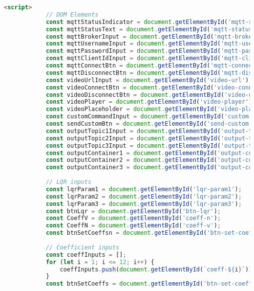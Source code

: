 \begin{lstlisting}[language=html]
        <script>
            // DOM Elements
            const mqttStatusIndicator = document.getElementById('mqtt-status-indicator');
            const mqttStatusText = document.getElementById('mqtt-status-text');
            const mqttBrokerInput = document.getElementById('mqtt-broker');
            const mqttUsernameInput = document.getElementById('mqtt-username');
            const mqttPasswordInput = document.getElementById('mqtt-password');
            const mqttClientIdInput = document.getElementById('mqtt-client-id');
            const mqttConnectBtn = document.getElementById('mqtt-connect');
            const mqttDisconnectBtn = document.getElementById('mqtt-disconnect');
            const videoUrlInput = document.getElementById('video-url');
            const videoConnectBtn = document.getElementById('video-connect');
            const videoDisconnectBtn = document.getElementById('video-disconnect');
            const videoPlayer = document.getElementById('video-player');
            const videoPlaceholder = document.getElementById('video-placeholder');
            const customCommandInput = document.getElementById('custom-command');
            const sendCustomBtn = document.getElementById('send-custom');
            const outputTopic1Input = document.getElementById('output-topic1');
            const outputTopic2Input = document.getElementById('output-topic2');
            const outputTopic3Input = document.getElementById('output-topic3');
            const outputContainer1 = document.getElementById('output-container1');
            const outputContainer2 = document.getElementById('output-container2');
            const outputContainer3 = document.getElementById('output-container3');
            
            // LQR inputs
            const lqrParam1 = document.getElementById('lqr-param1');
            const lqrParam2 = document.getElementById('lqr-param2');
            const lqrParam3 = document.getElementById('lqr-param3');
            const btnLqr = document.getElementById('btn-lqr');
            const CoeffV = document.getElementById('coeff-n');
            const CoeffN = document.getElementById('coeff-v');
            const btnSetCoeffsn = document.getElementById('btn-set-coeffs-n');
            
            // Coefficient inputs
            const coeffInputs = [];
            for (let i = 1; i <= 12; i++) {
                coeffInputs.push(document.getElementById(`coeff-${i}`));
            }
            const btnSetCoeffs = document.getElementById('btn-set-coeffs');
            

\end{lstlisting}
